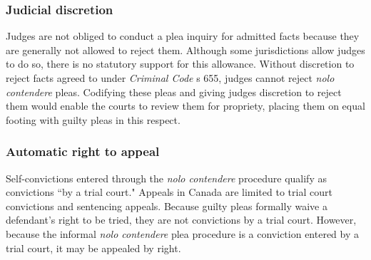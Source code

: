 \subsubsection{Judicial discretion}

Judges are not obliged to conduct a plea inquiry for admitted facts because they are generally not allowed to reject them. Although some jurisdictions allow judges to do so, there is no statutory support for this allowance. Without discretion to reject facts agreed to under \textit{Criminal Code} s 655, judges cannot reject \textit{nolo contendere} pleas. Codifying these pleas and giving judges discretion to reject them would enable the courts to review them for propriety, placing them on equal footing with guilty pleas in this respect.

\subsubsection{Automatic right to appeal}

Self-convictions entered through the \textit{nolo contendere} procedure qualify as convictions ``by a trial court." Appeals in Canada are limited to trial court convictions and sentencing appeals. Because guilty pleas formally waive a defendant's right to be tried, they are not convictions by a trial court. However, because the informal \textit{nolo contendere} plea procedure is a conviction entered by a trial court, it may be appealed by right.

